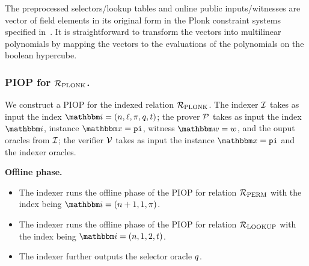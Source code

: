 \begin{remark}[Arithmetization]
    The preprocessed selectors/lookup tables and online public inputs/witnesses are vector
    of field elements in its original form in the Plonk constraint systems specified in~\cite{GWC19}.
    It is straightforward to transform the vectors into multilinear polynomials by mapping the 
    vectors to the evaluations of the polynomials on the boolean hypercube. 
\end{remark}

\subsubsection*{PIOP for ${\mathcal{R}}_{\text{PLONK}}$.}
We construct a PIOP for the indexed relation ${\mathcal{R}}_{\text{PLONK}}$.
The indexer $\mathcal{I}$ takes as input the index $\idxR = (n, \ell, \perm, \sel, \tabp)$;
the prover $\mathcal{P}$ takes as input the index $\idxR$, instance $\instR = \pubinp$,
witness $\witR = \witp$, and the ouput oracles from $\mathcal{I}$;
the verifier $\mathcal{V}$ takes as input the instance $\instR = \pubinp$ and 
the indexer oracles.


\textbf{Offline phase.}
\begin{itemize}
    \item The indexer runs the offline phase of the PIOP for relation ${\mathcal{R}}_{\text{PERM}}$ with 
        the index being $\idxR = (n+1, 1, \perm)$.
    \item The indexer runs the offline phase of the PIOP for relation ${\mathcal{R}}_{\text{LOOKUP}}$ with
        the index being $\idxR = (n, 1, 2, \tabp)$.
    \item The indexer further outputs the selector oracle $q$.
\end{itemize}



